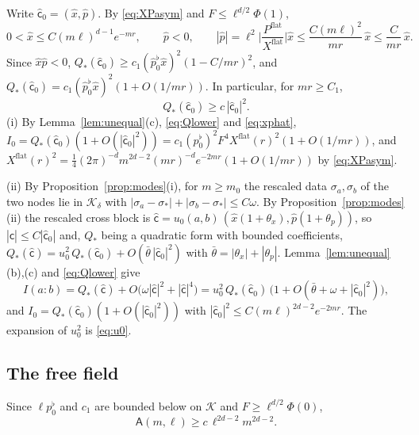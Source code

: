 \documentclass[11pt,a4paper]{article}
\makeatletter
\theoremstyle{stmt}
\theoremstyle{defn}
\theoremstyle{rmk}
\renewenvironment{proof}[1][\proofname]{\par\pushQED{\qed}\normalfont\topsep6\p@\@plus6\p@\relax
  \trivlist\item[\hskip\labelsep{\sffamily\itshape\small #1.}]\ignorespaces}{\popQED\endtrivlist\@endpefalse}
\numberwithin{equation}{section}
\makeatother
\begin{document}
\begin{proof}[Proof of Corollary~\ref{cor:curvedMI}]
Write $\hat{\mathsf c}_0=(\hat x,\hat p)$. By \eqref{eq:XPasym} and $F\le\ell^{d/2}\Phi(1)$,
\begin{equation}\label{eq:xphat}
0<\hat x\le C(m\ell)^{d-1}e^{-mr},\qquad\hat p<0,\qquad|\hat p|=\ell^2\Big|\frac{P^{\mathrm{flat}}}{X^{\mathrm{flat}}}\Big|\hat x\le\frac{C(m\ell)^2}{mr}\,\hat x\le\frac{C}{mr}\,\hat x .
\end{equation}
Since $\hat x\hat p<0$, $Q_*(\hat{\mathsf c}_0)\ge c_1(\hat p_0^\flat\hat x)^2(1-C/mr)^2$, and $Q_*(\hat{\mathsf c}_0)=c_1(\hat p_0^\flat\hat x)^2(1+O(1/mr))$. In particular, for $mr\ge C_1$,
\begin{equation}\label{eq:Qlower}
Q_*(\hat{\mathsf c}_0)\ge c\,|\hat{\mathsf c}_0|^2 .
\end{equation}
(i) By Lemma~\ref{lem:unequal}(c), \eqref{eq:Qlower} and \eqref{eq:xphat}, $I_0=Q_*(\hat{\mathsf c}_0)(1+O(|\hat{\mathsf c}_0|^2))=c_1(p_0^\flat)^2F^4X^{\mathrm{flat}}(r)^2(1+O(1/mr))$, and $X^{\mathrm{flat}}(r)^2=\tfrac14(2\pi)^{-d}m^{2d-2}(mr)^{-d}e^{-2mr}(1+O(1/mr))$ by \eqref{eq:XPasym}.

(ii) By Proposition~\ref{prop:modes}(i), for $m\ge m_0$ the rescaled data $\sigma_a,\sigma_b$ of the two nodes lie in $\mathcal K_\delta$ with $|\sigma_a-\sigma_*|+|\sigma_b-\sigma_*|\le C\omega$. By Proposition~\ref{prop:modes}(ii) the rescaled cross block is $\hat{\mathsf c}=u_0(a,b)\,(\hat x(1+\theta_x),\hat p(1+\theta_p))$, so $|\hat{\mathsf c}|\le C|\hat{\mathsf c}_0|$ and, $Q_*$ being a quadratic form with bounded coefficients, $Q_*(\hat{\mathsf c})=u_0^2\,Q_*(\hat{\mathsf c}_0)+O(\bar\theta\,|\hat{\mathsf c}_0|^2)$ with $\bar\theta=|\theta_x|+|\theta_p|$. Lemma~\ref{lem:unequal}(b),(c) and \eqref{eq:Qlower} give
\[
I(a:b)=Q_*(\hat{\mathsf c})+O\big(\omega|\hat{\mathsf c}|^2+|\hat{\mathsf c}|^4\big)=u_0^2\,Q_*(\hat{\mathsf c}_0)\,\big(1+O(\bar\theta+\omega+|\hat{\mathsf c}_0|^2)\big),
\]
and $I_0=Q_*(\hat{\mathsf c}_0)(1+O(|\hat{\mathsf c}_0|^2))$ with $|\hat{\mathsf c}_0|^2\le C(m\ell)^{2d-2}e^{-2mr}$. The expansion of $u_0^2$ is \eqref{eq:u0}.
\end{proof}

\subsection{The free field}

Since $\ell p_0^\flat$ and $c_1$ are bounded below on $\mathcal K$ and $F\ge\ell^{d/2}\Phi(0)$,
\begin{equation}\label{eq:Alower}
\mathsf A(m,\ell)\ge c\,\ell^{2d-2}m^{2d-2}.
\end{equation}
\end{document}
